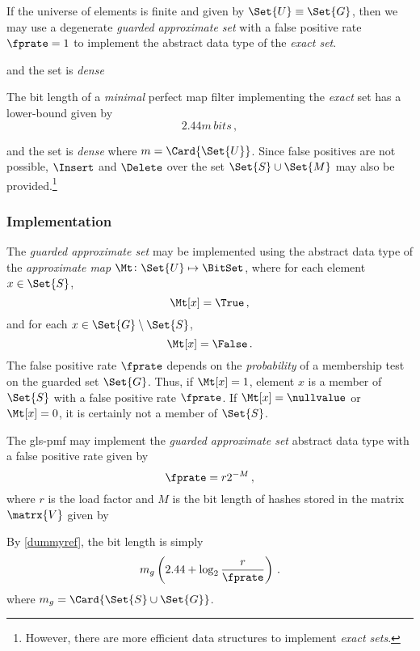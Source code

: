 \documentclass[ ../main.tex]{subfiles}
\begin{document}
If the universe of elements is finite and given by $\Set{U} \equiv \Set{G}$, then we may use a degenerate \emph{guarded approximate set} with a false positive rate $\fprate = 1$ to implement the abstract data type of the \emph{exact set}.




 and the set is \emph{dense}

The bit length of a \emph{minimal} perfect map filter implementing the \emph{exact} set has a lower-bound given by
\begin{equation}
    2.44 m \, \si{bits}\,,
\end{equation}

 and the set is \emph{dense}
where $m = \Card{\Set{U}}$. Since false positives are not possible, $\Insert$ and $\Delete$ over the set $\Set{S} \cup \Set{M}$ may also be provided.\footnote{However, there are more efficient data structures to implement \emph{exact sets}.}

\subsubsection*{Implementation}
The \emph{guarded approximate set} may be implemented using the abstract data type of the \emph{approximate map} $\Mt \colon \Set{U} \mapsto \BitSet$, where for each element $x \in \Set{S}$,
\begin{equation}
    \Mt[x] = \True\,,
\end{equation}
and for each $x \in \Set{G} \setminus \Set{S}$,
\begin{equation}
    \Mt[x] = \False\,.
\end{equation}
The false positive rate $\fprate$ depends on the \emph{probability} of a membership test on the guarded set $\Set{G}$. Thus, if $\Mt[x] = 1$, element $x$ is a member of $\Set{S}$ with a false positive rate $\fprate$. If $\Mt[x] = \nullvalue$ or $\Mt[x] = 0$, it is certainly not a member of $\Set{S}$.

\begin{theorem}
The \gls{gls-pmf} may implement the \emph{guarded approximate set} abstract data type with a false positive rate given by
\begin{equation}
    \fprate = r 2^{-M}\,,
\end{equation}
where $r$ is the load factor and $M$ is the bit length of hashes stored in the matrix $\matrx{V}$ given by 
\end{theorem}

By \cref{dummyref}, the bit length is simply
\begin{equation}
    m_g \left(2.44 + \log_2 \frac{r}{\fprate}\right)\,.
\end{equation}
where $m_g = \Card{\Set{S} \cup \Set{G}}$.
\end{document}
